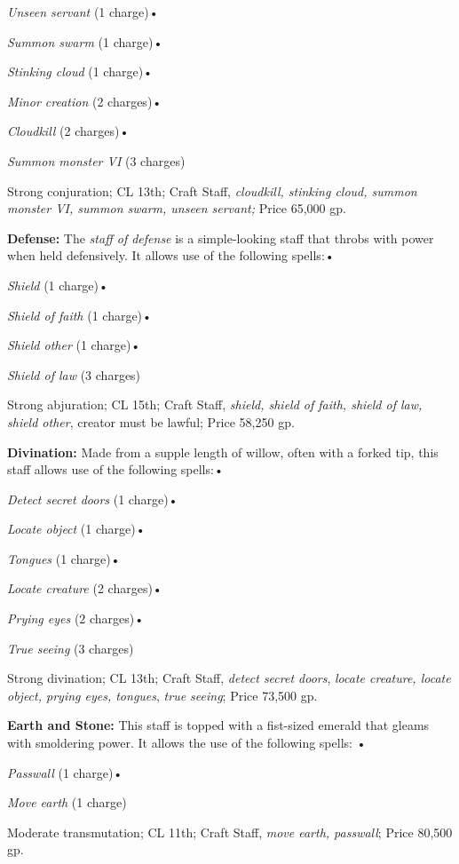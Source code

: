 \documentclass{article}
\begin{document}
\textit{Unseen servant }(1 charge)• 

\textit{Summon swarm }(1 charge)• 

\textit{Stinking cloud }(1 charge)• 

\textit{Minor creation }(2 charges)• 

\textit{Cloudkill }(2 charges)• 

\textit{Summon monster VI }(3 charges)

Strong conjuration; CL 13th; Craft Staff, \textit{cloudkill, stinking cloud, summon 
monster VI, summon swarm, unseen servant; }Price 65,000 gp.

\textbf{Defense: }The \textit{staff of defense }is a simple-looking staff that 
throbs with power when held defensively. It allows use of the following spells:• 

\textit{Shield }(1 charge)• 

\textit{Shield of faith }(1 charge)• 

\textit{Shield other }(1 charge)• 

\textit{Shield of law }(3 charges)

Strong abjuration; CL 15th; Craft Staff, \textit{shield, shield of faith, shield 
of law, shield other}, creator must be lawful; Price 58,250 gp.

\textbf{Divination:} Made from a supple length of willow, often with a forked tip, 
this staff allows use of the following spells:• 

\textit{Detect secret doors }(1 charge)• 

\textit{Locate object }(1 charge)• 

\textit{Tongues }(1 charge)• 

\textit{Locate creature }(2 charges)• 

\textit{Prying eyes }(2 charges)• 

\textit{True seeing }(3 charges)

Strong divination; CL 13th; Craft Staff, \textit{detect secret doors}, \textit{locate 
creature, locate object, prying eyes, tongues}, \textit{true seeing}; Price 73,500 
gp.

\textbf{Earth and Stone:} This staff is topped with a fist-sized emerald that gleams 
with smoldering power. It allows the use of the following spells: • 

\textit{Passwall }(1 charge)• 

\textit{Move earth }(1 charge)

Moderate transmutation; CL 11th; Craft Staff, \textit{move earth, passwall}; Price 
80,500 gp.
\end{document}
